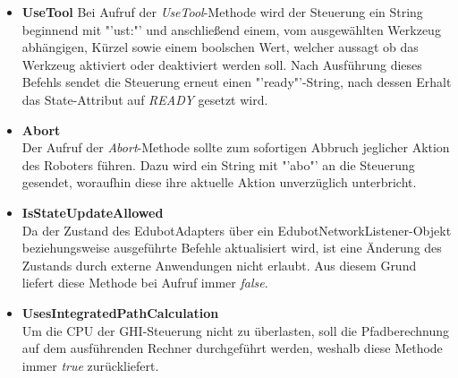 \begin{itemize}
\item \textbf{UseTool}
\newline
Bei Aufruf der \textit{UseTool}-Methode wird der Steuerung ein String beginnend mit "'ust:"' und anschließend einem, vom ausgewählten Werkzeug abhängigen, Kürzel sowie einem boolschen Wert, welcher aussagt ob das Werkzeug aktiviert oder deaktiviert werden soll. Nach Ausführung dieses Befehls sendet die Steuerung erneut einen "'ready"'-String, nach dessen Erhalt das State-Attribut auf \textit{READY} gesetzt wird. 
\item \textbf{Abort}\\
Der Aufruf der \textit{Abort}-Methode sollte zum sofortigen Abbruch jeglicher Aktion des Roboters führen. Dazu wird ein String mit "'abo"' an die Steuerung gesendet, woraufhin diese ihre aktuelle Aktion unverzüglich unterbricht.
\item \textbf{IsStateUpdateAllowed}\\
Da der Zustand des EdubotAdapters über ein EdubotNetworkListener-Objekt beziehungsweise ausgeführte Befehle aktualisiert wird, ist eine Änderung des Zustands durch externe Anwendungen nicht erlaubt. Aus diesem Grund liefert diese Methode bei Aufruf immer \textit{false}.
\item \textbf{UsesIntegratedPathCalculation}\\
Um die CPU der GHI-Steuerung nicht zu überlasten, soll die Pfadberechnung auf dem ausführenden Rechner durchgeführt werden, weshalb diese Methode immer \textit{true} zurückliefert.
\end{itemize}


